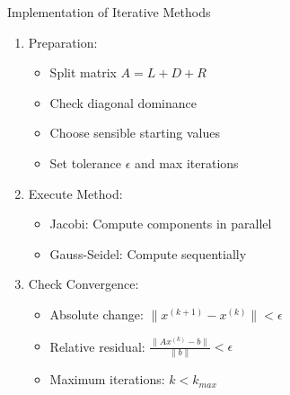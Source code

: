 \begin{KR}{Implementation of Iterative Methods}
\begin{enumerate}
    \item Preparation:
    \begin{itemize}
        \item Split matrix $A = L + D + R$
        \item Check diagonal dominance
        \item Choose sensible starting values
        \item Set tolerance $\epsilon$ and max iterations
    \end{itemize}
    
    \item Execute Method:
    \begin{itemize}
        \item Jacobi: Compute components in parallel
        \item Gauss-Seidel: Compute sequentially
    \end{itemize}
    
    \item Check Convergence:
    \begin{itemize}
        \item Absolute change: $\|x^{(k+1)} - x^{(k)}\| < \epsilon$
        \item Relative residual: $\frac{\|Ax^{(k)} - b\|}{\|b\|} < \epsilon$
        \item Maximum iterations: $k < k_{max}$
    \end{itemize}
\end{enumerate}
\end{KR}


